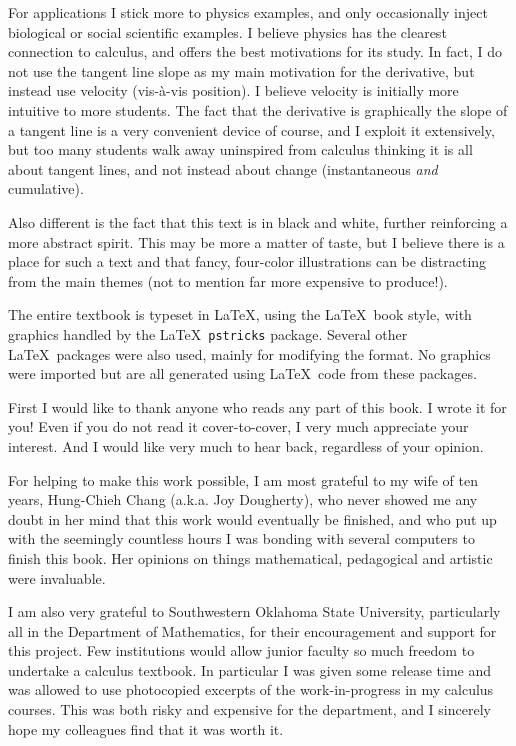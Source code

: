 \bigskip

\bigskip{}
\bigskip

For applications I 
stick more to physics examples,  and only occasionally inject biological or
social scientific examples.  I believe physics has the clearest connection 
to calculus, and offers the best motivations for its study.
In fact, I do not use the tangent line slope as
my main motivation for the derivative, but instead use velocity
(vis-\`a-vis position).  
I believe velocity is initially more intuitive
to more students.  The fact that the derivative is graphically
the slope of a tangent line is a very convenient device 
of course, and I exploit it extensively, but too many students
walk away uninspired from calculus thinking it is all
about tangent lines, and not instead about change
(instantaneous {\it and} cumulative).

\bigskip{}
\bigskip


Also different is the fact that this text is in black and white,
further reinforcing a more abstract spirit.
This may be more a matter of taste, but I believe
there is a place for such a text and that fancy,
four-color illustrations can be distracting from the
main themes (not to
mention far more expensive to produce!).  

The entire textbook is typeset in \LaTeX, using
the \LaTeX \ book style, with
graphics
handled by the \LaTeX \  {\tt pstricks} package.
Several other \LaTeX \ packages were also used, mainly
for modifying the format.  No graphics were imported
but are all generated using \LaTeX \ code from these packages.

\bigskip
{}
\bigskip

First I would like to thank anyone who reads any part of this book.
I wrote it for you!  Even if you do not read it cover-to-cover, I
very much appreciate your interest.  And I would like very much to 
hear back, regardless of your opinion.

For helping to make this work possible,
I am most grateful to my wife of ten years, Hung-Chieh Chang
(a.k.a. Joy Dougherty), who never showed me any doubt in her mind
that this work would
eventually be finished, and who put up with the seemingly countless hours
I was bonding with several computers to finish this book. 
Her opinions on things mathematical, pedagogical and artistic were
invaluable.

I am also very grateful to Southwestern Oklahoma State University,
particularly all in the Department of Mathematics, for their encouragement
and support for this project.  Few institutions would allow
junior faculty so much freedom to undertake a calculus textbook.
In particular I was given some release time 
and was allowed to use photocopied excerpts of the work-in-progress
in my calculus courses.  This was both risky and expensive for
the department, and I sincerely hope my colleagues find that
it was worth it.

